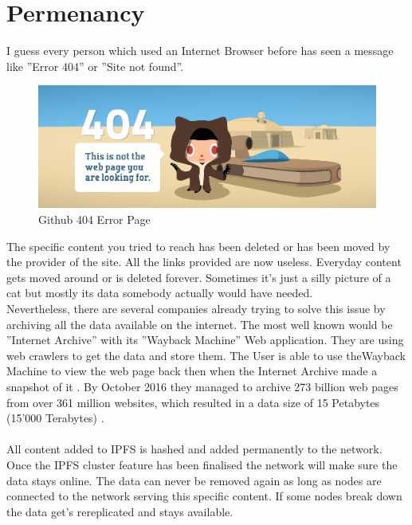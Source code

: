 \documentclass[a4paper,11pt, oneside]{report}
\theoremstyle{definition}
\begin{document}
\section{Permenancy}
I guess every person which used an Internet Browser before has seen a message like ''Error 404'' or ''Site not found''.
\begin{figure}[H]
\centering
\includegraphics[width=\textwidth]{img/github-404.png}
\caption[Github 404 Error Page]{Github 404 Error Page}
\end{figure}
\noindent
The specific content you tried to reach has been deleted or has been moved by the provider of the site. All the links provided are now useless. Everyday content gets moved around or is deleted forever. Sometimes it's just a silly picture of a cat but mostly its data somebody actually would have needed.\\[0.3cm]
Nevertheless, there are several companies already trying to solve this issue by archiving all the data available on the internet. The most well known would be ''Internet Archive'' with its ''Wayback Machine'' Web application. They are using web crawlers to get the data and store them. The User is able to use theWayback Machine to view the web page back then when the Internet Archive made a snapshot of it \cite{InternetArchive}. By October 2016 they managed to archive 273 billion web pages from over 361 million websites, which resulted in a data size of 15 Petabytes (15'000 Terabytes) \cite{InternetArchiveCount}.\\ \\
All content added to IPFS is hashed and added permanently to the network. Once the IPFS cluster feature has been finalised the network will make sure the data stays online. The data can never be removed again as long as nodes are connected to the network serving this specific content. If some nodes break down the data get's rereplicated and stays available.
\end{document}
